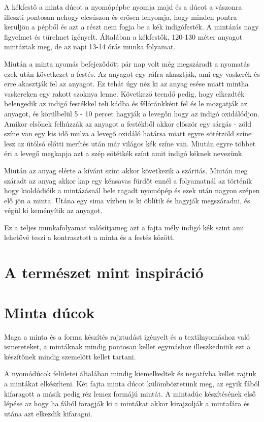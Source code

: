\documentclass[fontsize=12pt, appendixprefix=true]{scrreprt}
\begin{document}
A kékfestő a minta dúcot a nyomópépbe nyomja majd és a dúcot a vászonra illeszti pontosan nehogy elcsúszon és erősen lenyomja, hogy minden pontra kerüljön a pépből és azt a részt nem fogja be a kék indigófesték. A mintázás nagy figyelmet és türelmet igényelt. Általában a kékfestők, 120-130 méter anyagot mintáztak meg, de az napi 13-14 órás munka folyamat. 

Miután a minta nyomás befejeződött pár nap volt még megszáradt a nyomatás ezek után következet a festés.
Az anyagot egy ráfra akasztják,  ami egy vaskerék és erre akasztják fel az anyagot. Ez tehát úgy néz ki az anyag esése  miatt mintha vaskereken egy rakott szoknya lenne.
Következő teendő pedig, hogy elkezdték belengedik az indigó festékkel teli kádba és félóránkként fel és le mozgatják az anyagot, és körülbelül 5 - 10 percet hagyják a levegőn hogy az indigó oxidálódjon.
Amikor elsőnek felhúzzák az anyagot a festékből akkor először egy sárgás - zöld színe van egy kis idő  mulva a levegő oxidáló határsa miatt egyre sötétzöld színe lesz az útólsó előtti merítés után már világos kék színe van. Miután egyre többet éri a levegő megkapja azt a szép sötétkék színt amit indigó kéknek nevezünk. 

Miután az anyag elérte a kívánt színt akkor következik a száritás. Miután meg száradt az anyag akkor kap egy kénsavas fürdőt ennél a folyamatnál az történik hogy kioldódióik a mintázásnál bele ragadt nyomópép és ezek után nagyon szépen elő jön a minta. Utána egy sima vízben is ki öblítik és hagyják megszáradni, és végül ki keményítik az anyagot.

Ez a teljes munkafolyamat valósítjameg azt a fajta mély indigó kék szint ami lehetővé teszi a kontrasztott a minta és a festés között.


\section{A természet mint inspiráció}
\section{Minta dúcok}
Maga a minta és a forma készítés rajztudást igényelt és a textilnyomáshoz való ismereteket, a mintáknak mindig pontosan kellet egymáshoz illeszkedniük ezt a készítőnek mindig szemelött kellet tartani.

A nyomódúcok felületei általában mindig kiemelkedtek és negatívba kellet rajtuk a mintákat elkészíteni. Két fajta minta dúcot külömböztetünk meg, az egyik fából kifaragott a másik pedig réz lemez formájú mintát. A mintadúc készítésének első lépése az hogy ha fából faragják ki a mintákat akkor kirajzolják a mintafára és utána azt elkezdik kifaragni. 
\end{document}
